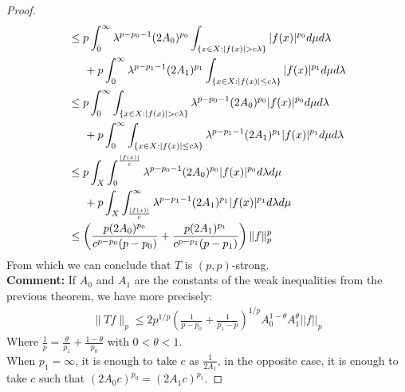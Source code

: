 \begin{proof}
\begin{align*}
    & \leq p \int_0^\infty \lambda^{p - p_0 - 1} (2A_0)^{p_0} \int_{\{x \in X: |f(x)| > c\lambda\}} |f(x)|^{p_0} d\mu d\lambda\\
    & \hspace{0.5cm} + p \int_0^\infty \lambda^{p - p_1 - 1} (2A_1)^{p_1} \int_{\{x \in X: |f(x)| \leq c\lambda\}} |f(x)|^{p_1} d\mu d\lambda\\
    & \leq p \int_0^\infty \int_{\{x \in X: |f(x)| > c\lambda\}} \lambda^{p - p_0 - 1} (2A_0)^{p_0} |f(x)|^{p_0} d\mu d\lambda\\
    & \hspace{0.5cm} + p \int_0^\infty \int_{\{x \in X: |f(x)| \leq c\lambda\}} \lambda^{p - p_1 - 1} (2A_1)^{p_1} |f(x)|^{p_1} d\mu d\lambda\\
    & \leq p \int_X \int_0^{\frac{|f(x)|}{c}} \lambda^{p - p_0 - 1} (2A_0)^{p_0} |f(x)|^{p_0} d\lambda d\mu\\
    & \hspace{0.5cm} + p \int_X \int_{\frac{|f(x)|}{c}}^\infty \lambda^{p - p_1 - 1} (2A_1)^{p_1} |f(x)|^{p_1} d\lambda d\mu\\
    & \leq \left(\frac{p(2A_0)^{p_0}}{c^{p - p_0}(p - p_0)} + \frac{p(2A_1)^{p_1}}{c^{p - p_1}(p - p_1)}\right) \|f\|_p^p
  \end{align*}
  From which we can conclude that $T$ is $(p,p)$-strong.\\
  \textbf{Comment:} If $A_0$ and $A_1$ are the constants of the weak inequalities from the previous theorem, we have more precisely:
  \begin{align*}
    \|Tf\|_p \leq 2p^{1/p} \left(\frac{1}{p - p_0} + \frac{1}{p_1 - p}\right)^{1/p} A_0^{1 - \theta} A_1^{\theta} ||f||_p
  \end{align*}
  Where $\frac{1}{p} = \frac{\theta}{p_1} + \frac{1 - \theta}{p_0}$ with $0 < \theta < 1$.\\
  When $p_1 = \infty$, it is enough to take $c$ as $\frac{1}{2A_1}$, in the opposite case, it is enough to take $c$ such that $(2A_0 c)^{p_0} = (2A_1 c)^{p_1}$.
\end{proof}
